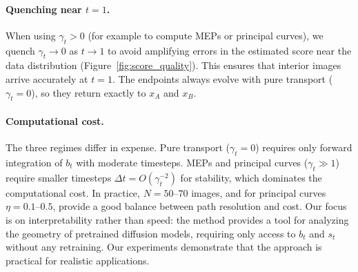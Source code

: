 \documentclass{article}
\theoremstyle{plain}
\theoremstyle{definition}
\theoremstyle{remark}
\begin{document}
\paragraph{Quenching near $t=1$.} When using $\gamma_t >0$ (for example to compute MEPs or principal curves), we quench $\gamma_t \to 0$ as $t \to 1$ to avoid amplifying errors in the estimated score near the data distribution (Figure~\ref{fig:score_quality}). This ensures that interior images arrive accurately at $t = 1$. The endpoints always evolve with pure transport ($\gamma_t = 0$), so they return exactly to $x_A$ and $x_B$.




\paragraph{Computational cost.} The three regimes differ in expense. Pure transport ($\gamma_t = 0$) requires only forward integration of $b_t$ with moderate timesteps. MEPs and principal curves ($\gamma_t \gg 1$) require smaller timesteps $\Delta t = O(\gamma_t^{-2})$ for stability, which dominates the computational cost. In practice, $N = 50$--$70$ images, and for principal curves $\eta = 0.1$--$0.5$, provide a good balance between path resolution and cost. Our focus is on interpretability rather than speed: the method provides a tool for analyzing the geometry of pretrained diffusion models, requiring only access to $b_t$ and $s_t$ without any retraining. Our experiments demonstrate that the approach is practical for realistic applications.
\end{document}
